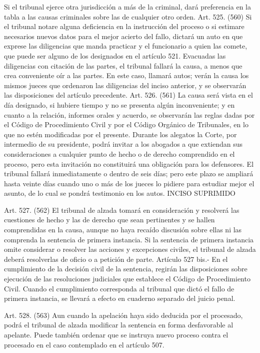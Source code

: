     Si el tribunal ejerce otra jurisdicción a más de la criminal, dará preferencia en la tabla a las causas criminales sobre las de cualquier otro orden.
    Art. 525. (560) Si el tribunal notare alguna deficiencia en la instrucción del proceso o si estimare necesarios nuevos datos para el mejor acierto del fallo, dictará un auto en que exprese las diligencias que manda practicar y el funcionario a quien las comete, que puede ser alguno de los designados en el artículo 521.
    Evacuadas las diligencias con citación de las partes, el tribunal fallará la causa, a menos que crea conveniente oír a las partes. En este caso, llamará autos; verán la causa los mismos jueces que ordenaron las diligencias del inciso anterior, y se observarán las disposiciones del artículo precedente.
    Art. 526. (561) La causa será vista en el día designado, si hubiere tiempo y no se presenta algún inconveniente; y en cuanto a la relación, informes orales y acuerdo, se observarán las reglas dadas por el Código de Procedimiento Civil y por el Código Orgánico de Tribunales, en lo que no estén modificadas por el presente.
    Durante los alegatos la Corte, por intermedio de su presidente, podrá invitar a los abogados a que extiendan sus consideraciones a cualquier punto de hecho o de derecho comprendido en el proceso, pero esta invitación no constituirá una obligación para los defensores.
    El tribunal fallará inmediatamente o dentro de seis días; pero este plazo se ampliará hasta veinte días cuando uno o más de los jueces lo pidiere para estudiar mejor el asunto, de lo cual se pondrá testimonio en los autos.
    INCISO SUPRIMIDO

    Art. 527. (562) El tribunal de alzada tomará en consideración y resolverá las cuestiones de hecho y las de derecho que sean pertinentes y se hallen comprendidas en la causa, aunque no haya recaído discusión sobre ellas ni las comprenda la sentencia de primera instancia.
    Si la sentencia de primera instancia omite considerar o resolver las acciones y excepciones civiles, el tribunal de alzada deberá resolverlas de oficio o a petición de parte.
    Artículo 527 bis.- En el cumplimiento de la decisión civil de la sentencia, regirán las disposiciones sobre ejecución de las resoluciones judiciales que establece el Código de Procedimiento Civil. Cuando el cumplimiento corresponda al tribunal que dictó el fallo de primera instancia, se llevará a efecto en cuaderno separado del juicio penal.

    Art. 528. (563) Aun cuando la apelación haya sido deducida por el procesado, podrá el tribunal de alzada modificar la sentencia en forma desfavorable al apelante.
    Puede también ordenar que se instruya nuevo proceso contra el procesado en el caso contemplado en el artículo 507.



